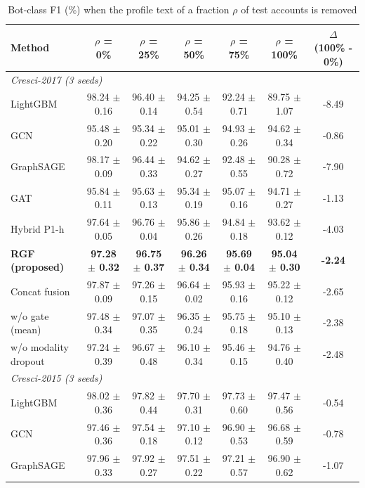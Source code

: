 \begin{table}[!t]
\centering
\caption{Bot-class F1 (\%) when the profile text of a fraction $\rho$ of test accounts is removed}
\label{tab:missing_text}
\footnotesize
\setlength{\tabcolsep}{3pt}
\begin{tabular}{lcccccc}
\hline
\textbf{Method} & \textbf{$\rho$ = 0\%} & \textbf{$\rho$ = 25\%} & \textbf{$\rho$ = 50\%} & \textbf{$\rho$ = 75\%} & \textbf{$\rho$ = 100\%} & \textbf{$\Delta$ (100\% - 0\%)} \\
\hline
\multicolumn{7}{l}{\textit{Cresci-2017 (3 seeds)}} \\
LightGBM & 98.24 $\pm$ 0.16 & 96.40 $\pm$ 0.14 & 94.25 $\pm$ 0.54 & 92.24 $\pm$ 0.71 & 89.75 $\pm$ 1.07 & -8.49 \\
GCN & 95.48 $\pm$ 0.20 & 95.34 $\pm$ 0.22 & 95.01 $\pm$ 0.30 & 94.93 $\pm$ 0.26 & 94.62 $\pm$ 0.34 & -0.86 \\
GraphSAGE & 98.17 $\pm$ 0.09 & 96.44 $\pm$ 0.33 & 94.62 $\pm$ 0.27 & 92.48 $\pm$ 0.55 & 90.28 $\pm$ 0.72 & -7.90 \\
GAT & 95.84 $\pm$ 0.11 & 95.63 $\pm$ 0.13 & 95.34 $\pm$ 0.19 & 95.07 $\pm$ 0.16 & 94.71 $\pm$ 0.27 & -1.13 \\
Hybrid P1-h & 97.64 $\pm$ 0.05 & 96.76 $\pm$ 0.04 & 95.86 $\pm$ 0.26 & 94.84 $\pm$ 0.18 & 93.62 $\pm$ 0.12 & -4.03 \\
\textbf{RGF (proposed)} & \textbf{97.28 $\pm$ 0.32} & \textbf{96.75 $\pm$ 0.37} & \textbf{96.26 $\pm$ 0.34} & \textbf{95.69 $\pm$ 0.04} & \textbf{95.04 $\pm$ 0.30} & \textbf{-2.24} \\
Concat fusion & 97.87 $\pm$ 0.09 & 97.26 $\pm$ 0.15 & 96.64 $\pm$ 0.02 & 95.93 $\pm$ 0.16 & 95.22 $\pm$ 0.12 & -2.65 \\
w/o gate (mean) & 97.48 $\pm$ 0.34 & 97.07 $\pm$ 0.35 & 96.35 $\pm$ 0.24 & 95.75 $\pm$ 0.18 & 95.10 $\pm$ 0.13 & -2.38 \\
w/o modality dropout & 97.24 $\pm$ 0.39 & 96.67 $\pm$ 0.48 & 96.10 $\pm$ 0.34 & 95.46 $\pm$ 0.15 & 94.76 $\pm$ 0.40 & -2.48 \\
\multicolumn{7}{l}{\textit{Cresci-2015 (3 seeds)}} \\
LightGBM & 98.02 $\pm$ 0.36 & 97.82 $\pm$ 0.44 & 97.70 $\pm$ 0.31 & 97.73 $\pm$ 0.60 & 97.47 $\pm$ 0.56 & -0.54 \\
GCN & 97.46 $\pm$ 0.36 & 97.54 $\pm$ 0.18 & 97.10 $\pm$ 0.12 & 96.90 $\pm$ 0.53 & 96.68 $\pm$ 0.59 & -0.78 \\
GraphSAGE & 97.96 $\pm$ 0.33 & 97.92 $\pm$ 0.27 & 97.51 $\pm$ 0.22 & 97.21 $\pm$ 0.57 & 96.90 $\pm$ 0.62 & -1.07 \\

\end{tabular}
\end{table}
